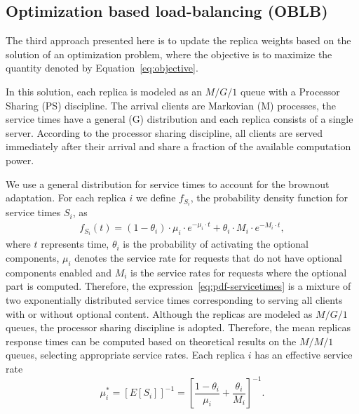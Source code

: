 
\subsection{Optimization based load-balancing (OBLB)}

The third approach presented here is to update the replica weights
based on the solution of an optimization problem, where the objective
is to maximize the quantity denoted by Equation~\eqref{eq:objective}.

In this solution, each replica is modeled as an $M/G/1$ queue with a
Processor Sharing (PS) discipline. The arrival clients are Markovian
(M) processes, the service times have a general (G) distribution and
each replica consists of a single server. According to the processor
sharing discipline, all clients are served immediately after their
arrival and share a fraction of the available computation power.

We use a general distribution for service times to account for the
brownout adaptation. For each replica $i$ we define $f_{S_i}$, the
probability density function for service times $S_i$, as
\begin{align}
  f_{S_i} (t) = (1 - \theta_i) \cdot \mu_i \cdot e^{-\mu_i \cdot t} +
  \theta_i \cdot M_i \cdot e^{-M_i \cdot t} ,
\label{eq:pdf-servicetimes}
\end{align}
where $t$ represents time, $\theta_i$ is the probability of activating
the optional components, $\mu_i$ denotes the service rate for requests
that do not have optional components enabled and $M_i$ is the service
rates for requests where the optional part is computed. Therefore, the
expression~\eqref{eq:pdf-servicetimes} is a mixture of two
exponentially distributed service times corresponding to serving all
clients with or without optional content. Although the replicas are
modeled as $M/G/1$ queues, the processor sharing discipline is
adopted. Therefore, the mean replicas response times can be computed
based on theoretical results on the $M/M/1$ queues, selecting
appropriate service rates. Each replica $i$ has an effective service
rate
\begin{equation}
  \mu_i^* = \left[ E[S_i] \right]^{-1} = \left[ \frac{1-\theta_i}{\mu_i}
    + \frac{\theta_i}{M_i} \right]^{-1} .
  \label{eq:effective-service-rate}
\end{equation}

